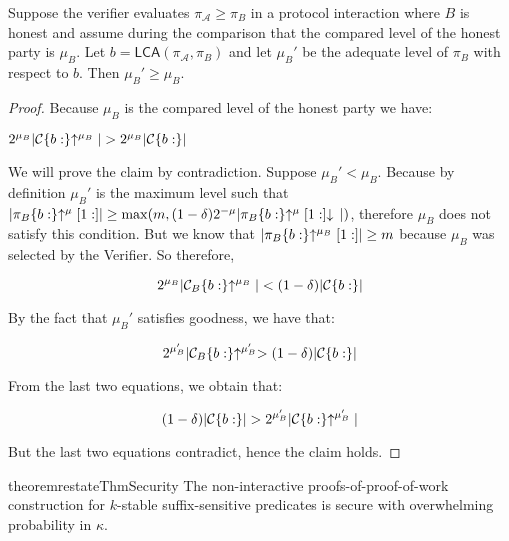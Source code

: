 \begin{lemma}
Suppose the verifier evaluates $\pi_\mathcal{A} \geq \pi_B$ in a protocol
interaction where $B$ is honest and assume during the comparison that the
compared level of the honest party is $\mu_B$. Let $b =
\textsf{LCA}(\pi_\mathcal{A}, \pi_B)$ and let $\mu_B'$ be the adequate
level of $\pi_B$ with respect to $b$. Then $\mu_B' \geq \mu_B$.
\end{lemma}
\begin{proof}
    Because $\mu_B$ is the compared level of the honest party we have:

    $2^{\mu_B}|\mathcal{C}\{b:\}\negthickspace\uparrow^{\mu_B}| > 2^{\mu_B}|\mathcal{C}\{b:\}|$

    We will prove the claim by contradiction. Suppose $\mu_B' < \mu_B$. Because
    by definition $\mu_B'$ is the maximum level such that
    $|\pi_B\{b:\}\negthickspace\uparrow^\mu[1:]| \geq \max(m, (1 -
    \delta)2^{-\mu}|\pi_B\{b:\}\negthickspace\uparrow^\mu[1:]\negthickspace\downarrow\,|)$, therefore
    $\mu_B$ does not satisfy this condition. But we know that
    $|\pi_B\{b:\}\negthickspace\uparrow^{\mu_B}[1:]| \geq m$ because $\mu_B$ was selected by
    the Verifier. So therefore,

    \begin{equation*}
    2^{\mu_B}|\mathcal{C}_B\{b:\}\negthickspace\uparrow^{\mu_B}| < (1 - \delta)|\mathcal{C}\{b:\}|
    \end{equation*}

    By the fact that $\mu_B'$ satisfies goodness, we have that:

    \begin{equation*}
    2^{\mu_B'}|\mathcal{C}_B\{b:\}\negthickspace\uparrow^{\mu_B'} > (1 - \delta)|\mathcal{C}\{b:\}|
    \end{equation*}

    From the last two equations, we obtain that:

    \begin{equation*}
    (1 - \delta)|\mathcal{C}\{b:\}| > 2^{\mu_B'}|\mathcal{C}\{b:\}\negthickspace\uparrow^{\mu_B'}|
    \end{equation*}

    But the last two equations contradict, hence the claim holds.
    \Qed
\end{proof}

\begin{restatable}{theorem}{restateThmSecurity}
    \label{thm.security}
    The non-interactive proofs-of-proof-of-work construction for $k$-stable
    suffix-sensitive predicates is secure with overwhelming probability in
    $\kappa$.
\end{restatable}

